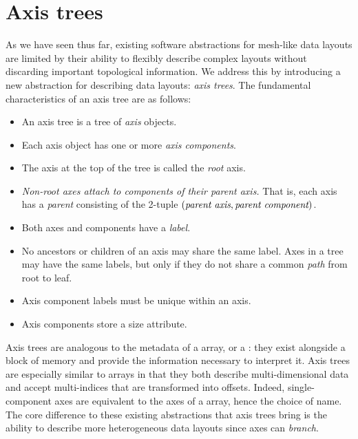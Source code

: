 \documentclass[thesis]{subfiles}
\begin{document}
\chapter{Axis trees}
\label{chapter:axis_trees}

As we have seen thus far, existing software abstractions for mesh-like data layouts are limited by their ability to flexibly describe complex layouts without discarding important topological information.
We address this by introducing a new abstraction for describing data layouts: \emph{axis trees}.
The fundamental characteristics of an axis tree are as follows:

\begin{itemize}
  \item
    An axis tree is a tree of \emph{axis} objects.

  \item
    Each axis object has one or more \emph{axis components}.

  \item
    The axis at the top of the tree is called the \emph{root} axis.

  \item
    \emph{Non-root axes attach to components of their parent axis.}
    That is, each axis has a \emph{parent} consisting of the 2-tuple $(\textnormal{\it parent axis}, \textnormal{\it parent component})$.

  \item
    Both axes and components have a \emph{label}.

  \item
    No ancestors or children of an axis may share the same label.
    Axes in a tree may have the same labels, but only if they do not share a common \emph{path} from root to leaf.

  \item
    Axis component labels must be unique within an axis.

  \item
    Axis components store a size attribute.
\end{itemize}


Axis trees are analogous to the metadata of a \numpy{} array, or a  : they exist alongside a block of memory and provide the information necessary to interpret it.
Axis trees are especially similar to \numpy{} arrays in that they both describe multi-dimensional data and accept multi-indices that are transformed into offsets.
Indeed, single-component axes are equivalent to the axes of a \numpy{} array, hence the choice of name.
The core difference to these existing abstractions that axis trees bring is the ability to describe more heterogeneous data layouts since axes can \emph{branch}.
\end{document}
